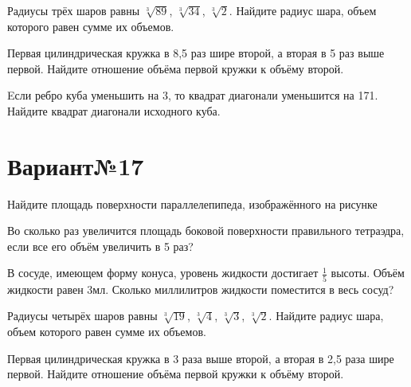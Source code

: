 \documentclass[4apaper]{article}
\begin{document}
\begin{taskBN}{4}
Радиусы трёх шаров равны $\sqrt[3]{89}$, $\sqrt[3]{34}$, $\sqrt[3]{2}$. Найдите радиус шара, объем которого равен сумме их объемов.
\end{taskBN}

\begin{taskBN}{5}
 Первая цилиндрическая кружка в 8,5 раз шире второй, а вторая в 5 раз выше первой. Найдите отношение объёма первой кружки к объёму второй.
\end{taskBN}

\begin{taskBN}{6}
Eсли ребро куба уменьшить на 3, то квадрат диагонали уменьшится на 171. Найдите квадрат диагонали исходного куба.
\end{taskBN}
\newpage\section*{Вариант№17}

\begin{taskBN}{1}
Найдите площадь поверхности параллелепипеда, изображённого на рисунке
\end{taskBN}

\begin{taskBN}{2}
Во сколько раз увеличится площадь боковой поверхности правильного тетраэдра, если все его объём увеличить в 5 раз?
\end{taskBN}

\begin{taskBN}{3}
В сосуде, имеющем форму конуса, уровень жидкости достигает $\frac{1}{5}$ высоты. Объём жидкости равен 3мл. Сколько миллилитров жидкости поместится в весь сосуд?
\end{taskBN}

\begin{taskBN}{4}
Радиусы четырёх шаров равны $\sqrt[3]{19}$, $\sqrt[3]{4}$, $\sqrt[3]{3}$, $\sqrt[3]{2}$. Найдите радиус шара, объем которого равен сумме их объемов.
\end{taskBN}

\begin{taskBN}{5}
 Первая цилиндрическая кружка в 3 раза выше второй, а вторая в 2,5 раза шире первой. Найдите отношение объёма первой кружки к объёму второй.
\end{taskBN}
\end{document}
